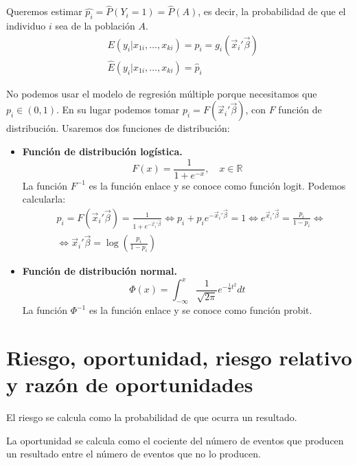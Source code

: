 Queremos estimar $\hat{p_i} = \hat{P}(Y_i = 1) = \hat{P}(A)$, es decir, la probabilidad de que el individuo $i$ sea de la población $A$.
\begin{align*}
     & E(y_i | x_{1i}, \dots, x_{ki}) = p_i = g_i(\vec{x}_i'\vec{\beta}) \\
     & \hat{E}(y_i | x_{1i}, \dots, x_{ki}) = \hat{p}_i
\end{align*}

No podemos usar el modelo de regresión múltiple porque necesitamos que $p_i \in (0, 1)$.
En su lugar podemos tomar $p_i = F(\vec{x}_i'\vec{\beta})$, con $F$ función de distribución.
Usaremos dos funciones de distribución:
\begin{itemize}
    \item \textbf{Función de distribución logística.}
          $$F(x) = \frac{1}{1 + e^{-x}}, \quad x \in \mathbb{R}$$
          La función $F^{-1}$ es la función enlace y se conoce como función logit.
          Podemos calcularla:
          \begin{align*}
               & p_i = F(\vec{x}_i'\vec{\beta}) = \frac{1}{1 + e^{-\vec{x}_i'\vec{\beta}}} \Leftrightarrow p_i + p_ie^{-\vec{x}_i'\vec{\beta}} = 1 \Leftrightarrow e^{\vec{x}_i'\vec{\beta}} = \frac{p_i}{1 - p_i} \Leftrightarrow \\
               & \Leftrightarrow \vec{x}_i'\vec{\beta} = \log\left(\frac{p_i}{1-p_i}\right)
          \end{align*}
    \item \textbf{Función de distribución normal.}
          $$\varPhi(x) = \int_{-\infty}^x \frac{1}{\sqrt{2\pi}} e^{-\frac{1}{2}t^2} dt$$
          La función $\varPhi^{-1}$ es la función enlace y se conoce como función probit.
\end{itemize}

\section{Riesgo, oportunidad, riesgo relativo y razón de oportunidades}
\begin{definition}[Riesgo]
    El riesgo se calcula como la probabilidad de que ocurra un resultado.
\end{definition}

\begin{definition}[Oportunidad]
    La oportunidad se calcula como el cociente del número de eventos que producen un resultado entre el número de eventos que no lo producen.
\end{definition}


